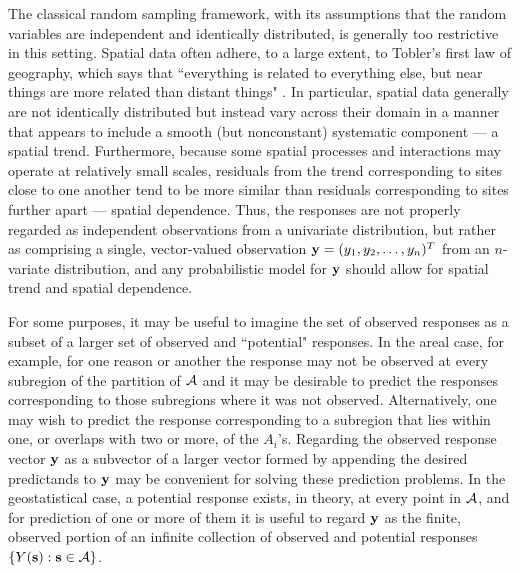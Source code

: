 The classical random sampling framework, with its assumptions that the random variables are independent and identically distributed, is generally too restrictive in this setting.  Spatial data often adhere, to a large extent, to Tobler's first law of geography, which says that ``everything is related to everything else, but near things are more related than distant things" \citep{tobler1970computer}.  In particular, spatial data generally are not identically distributed but instead vary across their domain in a manner that appears to include a smooth (but nonconstant) systematic component --- a spatial trend.  Furthermore, because some spatial processes and interactions may operate at relatively small scales, residuals from the trend corresponding to sites close to one another tend to be more similar than residuals corresponding to sites further apart --- spatial dependence.  Thus, the responses are not properly regarded as independent observations from a univariate distribution, but rather as comprising a single, vector-valued observation ${\bf y}=(y_1,y_2,\ldots,y_n)^T$ from an $n$-variate distribution, and any probabilistic model for ${\bf y}$ should allow for spatial trend and spatial dependence.

For some purposes, it may be useful to imagine the set of observed responses as a subset of a larger set of observed and ``potential" responses.  In the areal case, for example, for one reason or another the response may not be observed at every subregion of the partition of ${\cal A}$ and it may be desirable to predict the responses corresponding to those subregions where it was not observed.  Alternatively, one may wish to predict the response corresponding to a subregion that lies within one, or overlaps with two or more, of the $A_i$'s.  Regarding the observed response vector ${\bf y}$ as a subvector of a larger vector formed by appending the desired predictands to ${\bf y}$ may be convenient for solving these prediction problems.  In the geostatistical case, a potential response exists, in theory, at every point in ${\cal A}$, and for prediction of one or more of them it is useful to regard ${\bf y}$ as the finite, observed portion of an infinite collection of observed and potential responses $\{Y({\bf s}): {\bf s}\in{\cal A}\}$.

